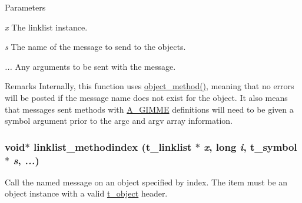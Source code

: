 \begin{DoxyParams}{Parameters}
\item[{\em x}]The linklist instance. \item[{\em s}]The name of the message to send to the objects. \item[{\em ...}]Any arguments to be sent with the message.\end{DoxyParams}
\begin{DoxyRemark}{Remarks}
Internally, this function uses \hyperlink{group__obj_gae740749094827ac5adc2b7145db1c596}{object\_\-method()}, meaning that no errors will be posted if the message name does not exist for the object. It also means that messages sent methods with \hyperlink{group__atom_gga8aa6700e9f00b132eb376db6e39ade47a81c1a8550f038db16a619167a70a79b6}{A\_\-GIMME} definitions will need to be given a symbol argument prior to the argc and argv array information. 
\end{DoxyRemark}
\hypertarget{group__linklist_ga17e04336154b16c19ac13f5f62fba009}{
\subsubsection[{linklist\_\-methodindex}]{\setlength{\rightskip}{0pt plus 5cm}void$\ast$ linklist\_\-methodindex ({\bf t\_\-linklist} $\ast$ {\em x}, \/  long {\em i}, \/  {\bf t\_\-symbol} $\ast$ {\em s}, \/   {\em ...})}}
\label{group__linklist_ga17e04336154b16c19ac13f5f62fba009}


Call the named message on an object specified by index. The item must be an object instance with a valid \hyperlink{structt__object}{t\_\-object} header.


